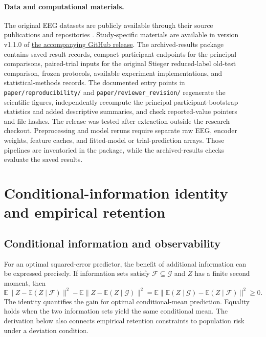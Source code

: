 \documentclass[11pt,a4paper]{article}
\newcommand{\E}{\mathbb{E}}
\begin{document}
\paragraph{Data and computational materials.}
The original EEG datasets are publicly available through their source publications and repositories \cite{stieger2021,lee2019,yang2025,farabbi2020}. Study-specific materials are available in version v1.1.0 of \href{https://github.com/Yiming-S/low-channel-eeg-adaptation/releases/tag/v1.1.0}{the accompanying GitHub release}. The archived-results package contains saved result records, compact participant endpoints for the principal comparisons, paired-trial inputs for the original Stieger reduced-label old-test comparison, frozen protocols, available experiment implementations, and statistical-methods records. The documented entry points in \texttt{paper/reproducibility/} and \texttt{paper/reviewer\_revision/} regenerate the scientific figures, independently recompute the principal participant-bootstrap statistics and added descriptive summaries, and check reported-value pointers and file hashes. The release was tested after extraction outside the research checkout. Preprocessing and model reruns require separate raw EEG, encoder weights, feature caches, and fitted-model or trial-prediction arrays. Those pipelines are inventoried in the package, while the archived-results checks evaluate the saved results.

\appendix

\section{Conditional-information identity and empirical retention}
\label{app:math}

\subsection{Conditional information and observability}

For an optimal squared-error predictor, the benefit of additional information can be expressed precisely. If information sets satisfy $\mathcal F\subseteq\mathcal G$ and $Z$ has a finite second moment, then
\begin{equation}
 \E\|Z-\E(Z\mid\mathcal F)\|^2-
 \E\|Z-\E(Z\mid\mathcal G)\|^2
 =\E\|\E(Z\mid\mathcal G)-\E(Z\mid\mathcal F)\|^2\geq0.
 \label{eq:information}
\end{equation}
The identity quantifies the gain for optimal conditional-mean prediction. Equality holds when the two information sets yield the same conditional mean. The derivation below also connects empirical retention constraints to population risk under a deviation condition.
\end{document}
